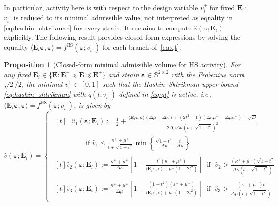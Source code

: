 \documentclass[preprint,3p]{elsarticle}
\newcommand{\tenss}[1]{\bm{\mathbf{#1}}}            %
\newcommand{\tensf}[1]{\bm{\mathbf{#1}}}            %
\newcommand{\strain}{\tenss{\varepsilon}}           %
\newcommand{\Ei}{\tensf{E}_i}                       %
\newcommand{\Emin}{\tensf{E}^{-}}                   %
\newcommand{\Emax}{\tensf{E}^{+}}                   %
\newtheorem{proposition}{Proposition}[section]
\begin{document}
In particular, activity here is with respect to the design variable $v_i^+$ for fixed $\Ei$: $v_i^+$ is reduced to its minimal admissible value, not interpreted as equality in \eqref{eq:hashin_shtrikman} for every strain.
%
It remains to compute $\hat{v}(\strain;\Ei)$ explicitly. The following result provides closed-form expressions by solving the equality $\langle\Ei\strain,\strain\rangle = f^{\mathrm{HS}}(\strain;v_i^+)$ for each branch of~\eqref{eq:qt}.
%
\begin{proposition}[Closed-form minimal admissible volume for HS activity]\label{prop:explicit_volume}
    For any fixed $\Ei \in \{\tensf{E}: \Emin \preceq \tensf{E} \preceq \Emax\}$ and strain $\strain \in \mathbb{S}^{2\times2}$ with the Frobenius norm $\sqrt{2}/2$, the minimal $v_i^+ \in [0,1]$ such that the Hashin--Shtrikman upper bound \eqref{eq:hashin_shtrikman} with $q(t;v_i^+)$ defined in \eqref{eq:qt} is active, i.e., $\langle \Ei \strain, \strain\rangle = f^{\mathrm{HS}}(\strain;v_i^+)$, is given by
    \begin{equation}
        \hat{v}(\strain;\Ei) =
    \begin{cases}
        \begin{aligned}[t]
            &\hat{v}_1 (\strain;\Ei) :=
            \frac{1}{2} + \frac{\langle\Ei\strain, \strain\rangle(\Delta\mu + \Delta\kappa) + (2t^2-1)(\Delta\kappa \mu^+ -\Delta\mu \kappa^+) - \sqrt{D}}{2 \Delta\mu \Delta\kappa (t + \sqrt{1 - t^2})^2}\\
            &\qquad \text{if } \hat{v}_1 \le \frac{\kappa^++\mu^+}{t + \sqrt{1-t^2}} \min\left\{ \frac{\sqrt{1-t^2}}{\Delta\kappa}, \frac{t}{\Delta \mu} \right\}
        \end{aligned}\\
        \begin{aligned}[t]
            \hat{v}_2 (\strain;\Ei) := \frac{\kappa^+ + \mu^+}{\Delta\kappa}\left[1 - \frac{t^2 (\kappa^- + \mu^+)}{ \langle\Ei\strain, \strain\rangle - \mu^+ (1 - 2t^2)}\right] \;\text{ if }\; \hat{v}_2 > \frac{(\kappa^+ + \mu^+)\sqrt{1-t^2}}{\Delta\kappa(t + \sqrt{1-t^2})}
        \end{aligned}\\
        \begin{aligned}[t]
            \hat{v}_3 (\strain;\Ei) := \frac{\kappa^+ + \mu^+}{\Delta\mu} \left[1 - \frac{(1-t^2) (\kappa^+ + \mu^-)}{\langle\Ei\strain, \strain\rangle + \kappa^+ (1 - 2t^2)}\right] \;\text{ if }\; \hat{v}_3 > \frac{(\kappa^+ + \mu^+)t}{\Delta\mu(t + \sqrt{1-t^2})}
        \end{aligned}

\end{cases}
\end{equation}
\end{proposition}
\end{document}
